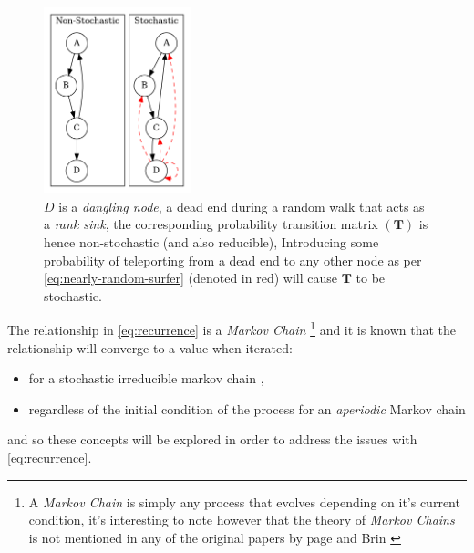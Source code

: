 \documentclass[11pt, twoside]{report}
\begin{document}
\begin{figure}
    \includegraphics[width=0.38\textwidth]{media/dot/stochastic_graph_example.dot.png}
    \caption{\label{fig:stochastic-example}\(D\) is a \emph{dangling node}, a dead end during a random walk that acts as a \textit{rank sink}, the corresponding probability transition matrix \((\mathbf{T})\) is hence non-stochastic (and also reducible), Introducing some probability of teleporting from a dead end to any other node as per \eqref{eq:nearly-random-surfer} (denoted in red) will cause \(\mathbf{T}\) to be stochastic.}
\end{figure}

The relationship in \eqref{eq:recurrence} is a \emph{Markov Chain} \footnote{A \emph{Markov Chain} is
simply any process that evolves depending on it's current condition, it's
interesting to note however that the theory of \emph{Markov Chains} is not mentioned in any
of the original papers by page and Brin
\cite[]{langvilleGooglePageRankScience2012}}  and it is known
that the relationship will converge to a value when iterated:

\begin{itemize}
\item for a stochastic irreducible markov chain \cite[.5]{larsonElementaryLinearAlgebra1991},
\item regardless of the initial condition of the process for an \emph{aperiodic} Markov chain \cite[]{langvilleGooglePageRankScience2012}
\end{itemize}

and so these concepts will be explored in order to address the issues with \eqref{eq:recurrence}.
\end{document}
